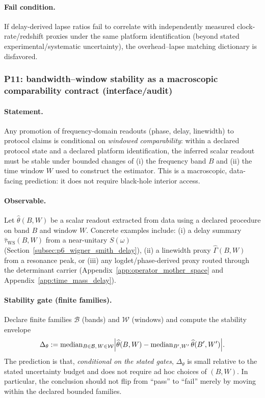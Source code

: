 \paragraph{Fail condition.}
If delay-derived lapse ratios fail to correlate with independently measured clock-rate/redshift proxies under the same platform identification (beyond stated experimental/systematic uncertainty), the overhead--lapse matching dictionary is disfavored.

\subsubsection{P11: bandwidth--window stability as a macroscopic comparability contract (interface/audit)}
\label{subsec:p11_bandwidth_window_stability}

\paragraph{Statement.}
\AuditTag Any promotion of frequency-domain readouts (phase, delay, linewidth) to protocol claims is conditional on \emph{windowed comparability}:
within a declared protocol state and a declared platform identification, the inferred scalar readout must be stable under bounded changes of
(i) the frequency band $B$ and (ii) the time window $W$ used to construct the estimator.
This is a macroscopic, data-facing prediction: it does not require black-hole interior access.

\paragraph{Observable.}
Let $\widehat\theta(B,W)$ be a scalar readout extracted from data using a declared procedure on band $B$ and window $W$.
Concrete examples include:
(i) a delay summary $\widehat\tau_{\mathrm{WS}}(B,W)$ from a near-unitary $S(\omega)$ (Section~\ref{subsec:p6_wigner_smith_delay}),
(ii) a linewidth proxy $\widehat\Gamma(B,W)$ from a resonance peak, or
(iii) any logdet/phase-derived proxy routed through the determinant carrier (Appendix~\ref{app:operator_mother_space} and Appendix~\ref{app:time_mass_delay}).

\paragraph{Stability gate (finite families).}
\AuditTag Declare finite families $\mathcal B$ (bands) and $\mathcal W$ (windows) and compute the stability envelope
\[
\Delta_\theta := \operatorname{median}_{B\in\mathcal B,\,W\in\mathcal W}\Bigl|\widehat\theta(B,W)-\operatorname{median}_{B',W'}\widehat\theta(B',W')\Bigr|.
\]
The prediction is that, \emph{conditional on the stated gates}, $\Delta_\theta$ is small relative to the stated uncertainty budget and does not require ad hoc choices of $(B,W)$.
In particular, the conclusion should not flip from ``pass'' to ``fail'' merely by moving within the declared bounded families.

